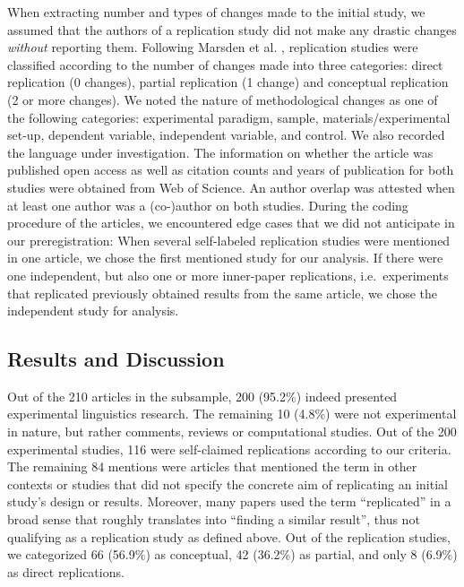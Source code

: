 \documentclass[cm,linguex]{glossa}
\begin{document}
When extracting number and types of changes made to the initial study, we assumed that the authors of a replication study did not make any drastic changes \emph{without} reporting them.
Following Marsden et al. \citeyearpar{marsden_replication_2018}, replication studies were classified according to the number of changes made into three categories: direct replication (0 changes), partial replication (1 change) and conceptual replication (2 or more changes).
We noted the nature of methodological changes as one of the following categories:
experimental paradigm, sample, materials/experimental set-up, dependent variable, independent variable, and control.
We also recorded the language under investigation.
The information on whether the article was published open access as well as citation counts and years of publication for both studies were obtained from Web of Science.
An author overlap was attested when at least one author was a (co-)author on both studies.
During the coding procedure of the articles, we encountered edge cases that we did not anticipate in our preregistration: When several self-labeled replication studies were mentioned in one article, we chose the first mentioned study for our analysis. If there were one independent, but also one or more inner-paper replications, i.e.~experiments that replicated previously obtained results from the same article, we chose the independent study for analysis.

\hypertarget{results-and-discussion-1}{%
\subsection{Results and Discussion}\label{results-and-discussion-1}}

Out of the 210 articles in the subsample, 200 (95.2\%) indeed presented experimental linguistics research. The remaining 10 (4.8\%) were not experimental in nature, but rather comments, reviews or computational studies. Out of the 200 experimental studies, 116 were self-claimed replications according to our criteria. The remaining 84 mentions were articles that mentioned the term in other contexts or studies that did not specify the concrete aim of replicating an initial study's design or results. Moreover, many papers used the term ``replicated'' in a broad sense that roughly translates into ``finding a similar result'', thus not qualifying as a replication study as defined above.
Out of the replication studies, we categorized 66 (56.9\%) as conceptual, 42 (36.2\%) as partial, and only 8 (6.9\%) as direct replications.
\end{document}
